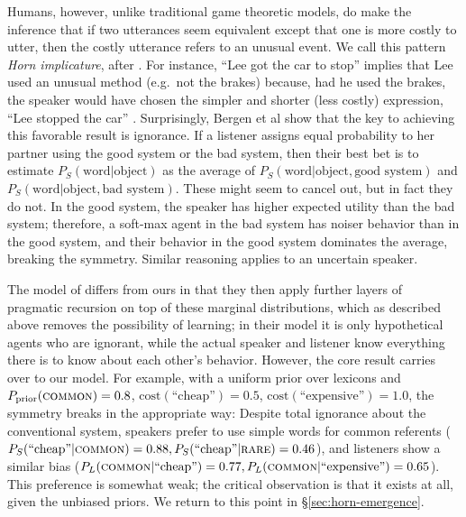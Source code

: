 \documentclass{article} %
\newcommand{\word}{\text{word}}
\newcommand{\obj}{\text{object}}
\begin{document}
Humans, however, unlike traditional game theoretic models, do make the
inference that if two utterances seem equivalent except that one is
more costly to utter, then the costly utterance refers to an unusual
event. We call this pattern \textit{Horn implicature}, after
\cite{horn1984}. For instance, ``Lee got the car to stop'' implies
that Lee used an unusual method (e.g.~not the brakes) because, had he
used the brakes, the speaker would have chosen the simpler and shorter
(less costly) expression, ``Lee stopped the car''
\cite{horn1984}. Surprisingly, Bergen et al \cite{bergen2012} show
that the key to achieving this favorable result is ignorance. If a
listener assigns equal probability to her partner using the good
system or the bad system, then their best bet is to estimate
$P_S(\word | \obj)$ as the average of $P_S(\word | \obj, \text{good
  system})$ and $P_S(\word | \obj, \text{bad system})$. These might
seem to cancel out, but in fact they do not. In the good system, the
speaker has higher expected utility than the bad system; therefore, a
soft-max agent in the bad system has noiser behavior than in the good
system, and their behavior in the good system dominates the average,
breaking the symmetry. Similar reasoning applies to an uncertain
speaker.


%
%

The model of \cite{bergen2012} differs from ours in that they then
apply further layers of pragmatic recursion on top of these marginal
distributions, which as described above removes the possibility of
learning; in their model it is only hypothetical agents who are
ignorant, while the actual speaker and listener know everything there
is to know about each other's behavior. However, the core result
carries over to our model. For example, with a uniform prior over
lexicons and $P_\text{prior}(\text{\textsc{common}}) = 0.8$,
$\text{cost}(\text{``cheap''}) = 0.5$,
$\text{cost}(\text{``expensive''}) = 1.0$, the symmetry breaks in the
appropriate way: Despite total ignorance about the conventional
system, speakers prefer to use simple words for common referents
($P_S(\text{``cheap''} | \text{\textsc{common}}) = 0.88,
P_S(\text{``cheap''} | \text{\textsc{rare}}) = 0.46$), and listeners
show a similar bias ($P_L(\text{\textsc{common}} | \text{``cheap''}) =
0.77, P_L(\text{\textsc{common}} | \text{``expensive''}) =
0.65$). This preference is somewhat weak; the critical observation is
that it exists at all, given the unbiased priors. We return to this
point in \S\ref{sec:horn-emergence}.
\end{document}
